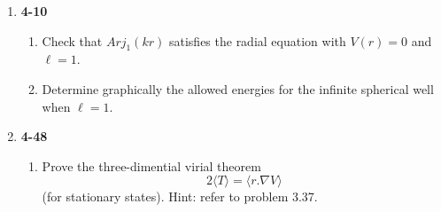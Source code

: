 \documentclass[fleqn]{article}
\begin{document}
  \begin{enumerate}
    \item \textbf{4-10} 
    \begin{enumerate}
      \item Check that $Arj_1(kr)$ satisfies the radial equation with $V(r)=0$ and $\ell=1$.
      \item Determine graphically the allowed energies for the infinite spherical well when $\ell=1$.
    \end{enumerate}

    \item \textbf{4-48} 
    \begin{enumerate}
      \item Prove the three-dimential virial theorem
      $$2\langle T \rangle=\langle r.\nabla V\rangle$$
      (for stationary states). Hint: refer to problem 3.37.


\end{enumerate}
\end{enumerate}
\end{document}
